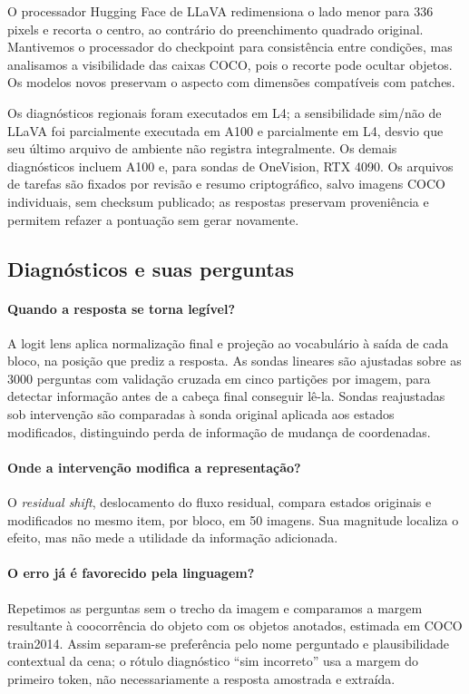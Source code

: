 O processador Hugging Face de LLaVA redimensiona o lado menor para 336 pixels e recorta o centro, ao contrário do preenchimento quadrado original. Mantivemos o processador do checkpoint para consistência entre condições, mas analisamos a visibilidade das caixas COCO, pois o recorte pode ocultar objetos. Os modelos novos preservam o aspecto com dimensões compatíveis com patches.

Os diagnósticos regionais foram executados em L4; a sensibilidade sim/não de LLaVA foi parcialmente executada em A100 e parcialmente em L4, desvio que seu último arquivo de ambiente não registra integralmente. Os demais diagnósticos incluem A100 e, para sondas de OneVision, RTX 4090. Os arquivos de tarefas são fixados por revisão e resumo criptográfico, salvo imagens COCO individuais, sem checksum publicado; as respostas preservam proveniência e permitem refazer a pontuação sem gerar novamente.

\subsection{Diagnósticos e suas perguntas}
\paragraph{Quando a resposta se torna legível?} A logit lens aplica normalização final e projeção ao vocabulário à saída de cada bloco, na posição que prediz a resposta. As sondas lineares são ajustadas sobre as 3000 perguntas com validação cruzada em cinco partições por imagem, para detectar informação antes de a cabeça final conseguir lê-la. Sondas reajustadas sob intervenção são comparadas à sonda original aplicada aos estados modificados, distinguindo perda de informação de mudança de coordenadas.

\paragraph{Onde a intervenção modifica a representação?} O \textit{residual shift}, deslocamento do fluxo residual, compara estados originais e modificados no mesmo item, por bloco, em 50 imagens. Sua magnitude localiza o efeito, mas não mede a utilidade da informação adicionada.

\paragraph{O erro já é favorecido pela linguagem?} Repetimos as perguntas sem o trecho da imagem e comparamos a margem resultante à coocorrência do objeto com os objetos anotados, estimada em COCO train2014. Assim separam-se preferência pelo nome perguntado e plausibilidade contextual da cena; o rótulo diagnóstico ``sim incorreto'' usa a margem do primeiro token, não necessariamente a resposta amostrada e extraída.

